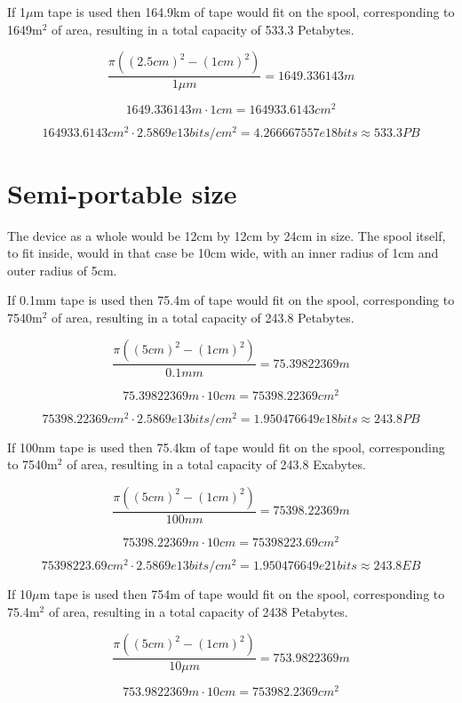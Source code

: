 \documentclass[a4paper]{article}
\begin{document}
	\vfill
	
	
	If 1$\mu$m tape is used then 164.9km of tape would fit on the spool, corresponding to 1649m$^2$ of area, resulting in a total capacity of 533.3 Petabytes.
	
	$$ \frac{\pi ((2.5cm)^2 - (1cm)^2)}{1\mu m} =  1649.336143m$$
	
	$$ 1649.336143m \cdot 1cm =  164933.6143cm^2 $$
	
	$$ 164933.6143cm^2 \cdot 2.5869e13bits/cm^2 = 4.266667557e18 bits \approx 533.3PB $$
	
	\pagebreak
	
	\section{Semi-portable size}
	
	The device as a whole would be 12cm by 12cm by 24cm in size. The spool itself, to fit inside, would in that case be 10cm wide, with an inner radius of 1cm and outer radius of 5cm.
	
	\vfill
	
	If 0.1mm tape is used then 75.4m of tape would fit on the spool, corresponding to 7540m$^2$ of area, resulting in a total capacity of 243.8 Petabytes.
	
	$$ \frac{\pi ((5cm)^2 - (1cm)^2)}{0.1mm} =  75.39822369 m$$
	
	$$ 75.39822369 m \cdot 10cm =  75398.22369 cm^2 $$
	
	$$ 75398.22369 cm^2 \cdot 2.5869e13bits/cm^2 =  1.950476649e18 bits \approx 243.8PB $$
	
	\vfill
	
	If 100nm tape is used then 75.4km of tape would fit on the spool, corresponding to 7540m$^2$ of area, resulting in a total capacity of 243.8 Exabytes.
	
	$$ \frac{\pi ((5cm)^2 - (1cm)^2)}{100nm} =  75398.22369 m$$
	
	$$ 75398.22369 m \cdot 10cm =  75398223.69 cm^2 $$
	
	$$ 75398223.69 cm^2 \cdot 2.5869e13bits/cm^2 = 1.950476649e21 bits \approx 243.8EB $$
	
	\vfill
	
	If 10$\mu$m tape is used then 754m of tape would fit on the spool, corresponding to 75.4m$^2$ of area, resulting in a total capacity of 2438 Petabytes.
	
	$$ \frac{\pi ((5cm)^2 - (1cm)^2)}{10\mu m} = 753.9822369 m $$
	
	$$ 753.9822369 m \cdot 10cm =  753982.2369 cm^2 $$
	
\end{document}
